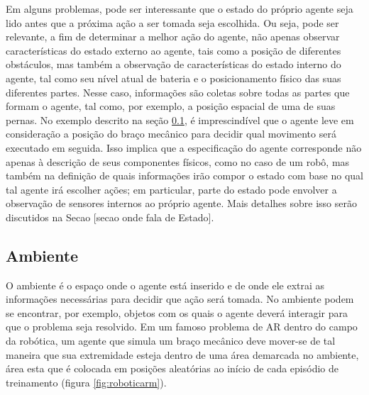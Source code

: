 \documentclass[cic,tc]{iiufrgs}
\begin{document}
    
    Em alguns problemas, pode ser interessante que o estado do próprio agente seja lido antes que a próxima ação a ser tomada seja escolhida.
    Ou seja, pode ser relevante, a fim de determinar a melhor ação do agente, não apenas observar características do estado externo ao agente,
     tais como a posição de diferentes obstáculos, mas também a observação de características do estado interno do agente, tal como seu nível atual de bateria
     e o posicionamento físico das suas diferentes partes.
    Nesse caso, informações são coletas sobre todas as partes que formam o agente, tal como, por exemplo, a posição espacial de uma de
    suas pernas. No exemplo descrito na seção \ref{ambiente}, é imprescindível que o agente leve em consideração a posição do braço mecânico
    para decidir qual movimento será executado em seguida. Isso implica que a especificação do agente corresponde não apenas à descrição de seus
    componentes físicos, como no caso de um robô, mas também na definição de quais informações irão compor o estado com base no qual tal agente irá escolher ações;
    em particular, parte do estado pode envolver a observação de sensores internos ao próprio agente. Mais detalhes sobre isso serão discutidos
     na Secao [secao onde fala de Estado].
    
    
    \subsection{Ambiente}
    \label{ambiente}
    O ambiente é o espaço onde o agente está inserido e de onde ele extrai as informações necessárias para decidir que ação será tomada.
    No ambiente podem se encontrar, por exemplo, objetos com os quais o agente deverá interagir para que o problema seja resolvido.
    Em um famoso problema de AR dentro do campo da robótica, um agente que simula um braço mecânico deve mover-se de tal maneira que
    sua extremidade esteja dentro de uma área demarcada no ambiente, área esta que é colocada em posições aleatórias ao início de cada episódio
    de treinamento (figura \ref{fig:roboticarm}). \par
    
\end{document}
